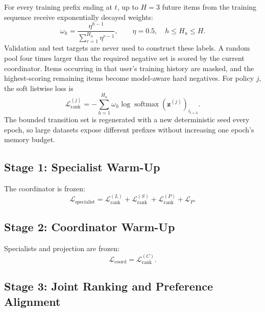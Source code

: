 \documentclass[11pt,a4paper]{article}
\newcommand{\softmax}{\operatorname{softmax}}
\begin{document}
For every training prefix ending at $t$, up to $H=3$ future items from the
training sequence receive exponentially decayed weights:
\begin{equation}
  \omega_h=\frac{\eta^{h-1}}{\sum_{r=1}^{H_u}\eta^{r-1}},
  \qquad \eta=0.5,\quad h\leq H_u\leq H.
\end{equation}
Validation and test targets are never used to construct these labels. A random
pool four times larger than the required negative set is scored by the current
coordinator. Items occurring in that user's training history are masked, and
the highest-scoring remaining items become model-aware hard negatives. For
policy $j$, the soft listwise loss is
\begin{equation}
  \mathcal L_{\mathrm{rank}}^{(j)}
  =-\sum_{h=1}^{H_u}\omega_h
    \log\softmax(\bm z^{(j)})_{i_{t+h}}.
\end{equation}
The bounded transition set is regenerated with a new deterministic seed every
epoch, so large datasets expose different prefixes without increasing one
epoch's memory budget.

\subsection{Stage 1: Specialist Warm-Up}

The coordinator is frozen:
\begin{equation}
  \mathcal L_{\mathrm{specialist}}
  =
  \mathcal L_{\mathrm{rank}}^{(L)}
  +\mathcal L_{\mathrm{rank}}^{(S)}
  +\mathcal L_{\mathrm{rank}}^{(P)}
  +\mathcal L_P.
\end{equation}

\subsection{Stage 2: Coordinator Warm-Up}

Specialists and projection are frozen:
\begin{equation}
  \mathcal L_{\mathrm{coord}}
  =
  \mathcal L_{\mathrm{rank}}^{(C)}.
\end{equation}

\subsection{Stage 3: Joint Ranking and Preference Alignment}
\end{document}
